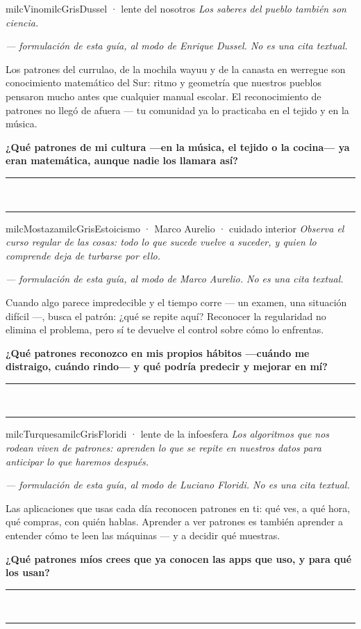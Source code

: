 \documentclass[11pt,letterpaper]{article}
\newcommand{\linead}[1]{\noindent\color{milcLinea}\rule{#1}{0.5pt}\color{milcNegro}}
\begin{document}
\begin{softbox}{milcVino}{milcGris}{Dussel · lente del nosotros}
\textit{Los saberes del pueblo también son ciencia.}

{\footnotesize\itshape\color{milcNegro!70}--- formulación de esta guía, al modo de Enrique Dussel. No es una cita textual.}

Los patrones del currulao, de la mochila wayuu y de la canasta en werregue son conocimiento matemático del Sur: ritmo y geometría que nuestros pueblos pensaron mucho antes que cualquier manual escolar. El reconocimiento de patrones no llegó de afuera --- tu comunidad ya lo practicaba en el tejido y en la música.

\textbf{¿Qué patrones de mi cultura ---en la música, el tejido o la cocina--- ya eran matemática, aunque nadie los llamara así?}
\end{softbox}
\linead{\linewidth}\\[1mm]
\linead{\linewidth}

\begin{softbox}{milcMostaza}{milcGris}{Estoicismo · Marco Aurelio · cuidado interior}
\textit{Observa el curso regular de las cosas: todo lo que sucede vuelve a suceder, y quien lo comprende deja de turbarse por ello.}

{\footnotesize\itshape\color{milcNegro!70}--- formulación de esta guía, al modo de Marco Aurelio. No es una cita textual.}

Cuando algo parece impredecible y el tiempo corre --- un examen, una situación difícil ---, busca el patrón: ¿qué se repite aquí? Reconocer la regularidad no elimina el problema, pero sí te devuelve el control sobre cómo lo enfrentas.

\textbf{¿Qué patrones reconozco en mis propios hábitos ---cuándo me distraigo, cuándo rindo--- y qué podría predecir y mejorar en mí?}
\end{softbox}
\linead{\linewidth}\\[1mm]
\linead{\linewidth}

\begin{softbox}{milcTurquesa}{milcGris}{Floridi · lente de la infoesfera}
\textit{Los algoritmos que nos rodean viven de patrones: aprenden lo que se repite en nuestros datos para anticipar lo que haremos después.}

{\footnotesize\itshape\color{milcNegro!70}--- formulación de esta guía, al modo de Luciano Floridi. No es una cita textual.}

Las aplicaciones que usas cada día reconocen patrones en ti: qué ves, a qué hora, qué compras, con quién hablas. Aprender a ver patrones es también aprender a entender cómo te leen las máquinas --- y a decidir qué muestras.

\textbf{¿Qué patrones míos crees que ya conocen las apps que uso, y para qué los usan?}
\end{softbox}
\linead{\linewidth}\\[1mm]
\linead{\linewidth}
\end{document}

